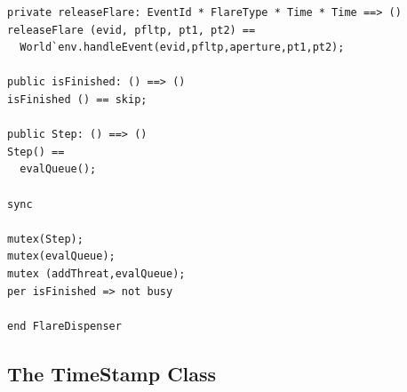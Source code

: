 \documentclass{overturerepchap}
\begin{document}
\begin{lstlisting}
private releaseFlare: EventId * FlareType * Time * Time ==> ()
releaseFlare (evid, pfltp, pt1, pt2) == 
  World`env.handleEvent(evid,pfltp,aperture,pt1,pt2);

public isFinished: () ==> ()
isFinished () == skip;

public Step: () ==> ()
Step() ==
  evalQueue();

sync

mutex(Step);
mutex(evalQueue);
mutex (addThreat,evalQueue);
per isFinished => not busy

end FlareDispenser
\end{lstlisting}


\subsection{The TimeStamp Class}
\end{document}
